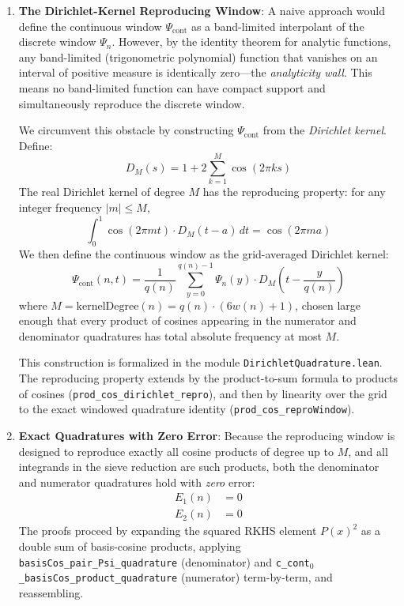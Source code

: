 \documentclass[10pt,twoside]{article}
\begin{document}
\begin{enumerate}
    \item \textbf{The Dirichlet-Kernel Reproducing Window}: A naive approach would define the continuous window $\Psi_{\text{cont}}$ as a band-limited interpolant of the discrete window $\Psi_n$. However, by the identity theorem for analytic functions, any band-limited (trigonometric polynomial) function that vanishes on an interval of positive measure is identically zero---the \emph{analyticity wall}. This means no band-limited function can have compact support and simultaneously reproduce the discrete window.
    
    We circumvent this obstacle by constructing $\Psi_{\text{cont}}$ from the \emph{Dirichlet kernel}. Define:
    \begin{equation}
    D_M(s) = 1 + 2 \sum_{k=1}^{M} \cos(2\pi k s)
    \end{equation}
    The real Dirichlet kernel of degree $M$ has the reproducing property: for any integer frequency $|m| \le M$,
    \begin{equation}
    \int_0^1 \cos(2\pi m t) \cdot D_M(t - a)\, dt = \cos(2\pi m a)
    \end{equation}
    We then define the continuous window as the grid-averaged Dirichlet kernel:
    \begin{equation}
    \Psi_{\text{cont}}(n, t) = \frac{1}{q(n)} \sum_{y=0}^{q(n)-1} \Psi_n(y) \cdot D_M\!\left(t - \frac{y}{q(n)}\right)
    \end{equation}
    where $M = \text{kernelDegree}(n) = q(n) \cdot (6 w(n) + 1)$, chosen large enough that every product of cosines appearing in the numerator and denominator quadratures has total absolute frequency at most $M$.
    
    This construction is formalized in the module \texttt{DirichletQuadrature.lean}. The reproducing property extends by the product-to-sum formula to products of cosines (\texttt{prod\_cos\_dirichlet\_repro}), and then by linearity over the grid to the exact windowed quadrature identity (\texttt{prod\_cos\_reproWindow}).
    
    \item \textbf{Exact Quadratures with Zero Error}: Because the reproducing window is designed to reproduce exactly all cosine products of degree up to $M$, and all integrands in the sieve reduction are such products, both the denominator and numerator quadratures hold with \emph{zero} error:
    \begin{align}
    E_1(n) &= 0 \\[4pt]
    E_2(n) &= 0
    \end{align}
    The proofs proceed by expanding the squared RKHS element $P(x)^2$ as a double sum of basis-cosine products, applying \texttt{basisCos\_pair\_Psi\_quadrature} (denominator) and \texttt{c\_cont$_0$\_basisCos\_product\_quadrature} (numerator) term-by-term, and reassembling.
    

\end{enumerate}
\end{document}
